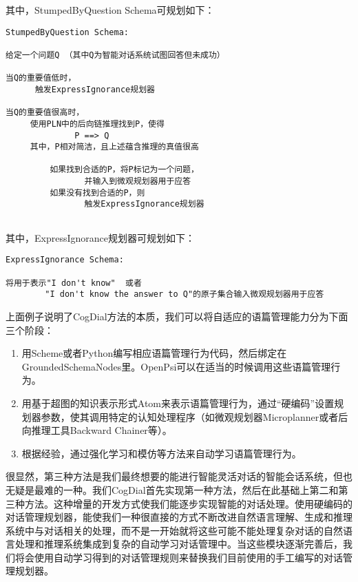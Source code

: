 \noindent 其中，StumpedByQuestion Schema可规划如下：

\begin{verbatim}
StumpedByQuestion Schema:

给定一个问题Q （其中Q为智能对话系统试图回答但未成功）

当Q的重要值低时，
      触发ExpressIgnorance规划器
				
当Q的重要值很高时，
     使用PLN中的后向链推理找到P，使得
              P ==> Q
     其中，P相对简洁，且上述蕴含推理的真值很高

         如果找到合适的P，将P标记为一个问题，
                并输入到微观规划器用于应答
         如果没有找到合适的P，则
                触发ExpressIgnorance规划器
		

\end{verbatim}

\noindent 其中，ExpressIgnorance规划器可规划如下：

\begin{verbatim}
ExpressIgnorance Schema:

将用于表示"I don't know"  或者
        "I don't know the answer to Q"的原子集合输入微观规划器用于应答
\end{verbatim}

上面例子说明了CogDial方法的本质，我们可以将自适应的语篇管理能力分为下面三个阶段：

\begin{enumerate}
\item 用Scheme或者Python编写相应语篇管理行为代码，然后绑定在GroundedSchemaNodes里。OpenPsi可以在适当的时候调用这些语篇管理行为。
\item 用基于超图的知识表示形式Atom来表示语篇管理行为，通过“硬编码”设置规划器参数，使其调用特定的认知处理程序（如微观规划器Microplanner或者后向推理工具Backward Chainer等）。
\item 根据经验，通过强化学习和模仿等方法来自动学习语篇管理行为。
\end{enumerate}

\noindent 很显然，第三种方法是我们最终想要的能进行智能灵活对话的智能会话系统，但也无疑是最难的一种。我们CogDial首先实现第一种方法，然后在此基础上第二和第三种方法。这种增量的开发方式使我们能逐步实现智能的对话处理。使用硬编码的对话管理规划器，能使我们一种很直接的方式不断改进自然语言理解、生成和推理系统中与对话相关的处理，而不是一开始就将这些可能不能处理复杂对话的自然语言处理和推理系统集成到复杂的自动学习对话管理中。当这些模块逐渐完善后，我们将会使用自动学习得到的对话管理规则来替换我们目前使用的手工编写的对话管理规划器。

